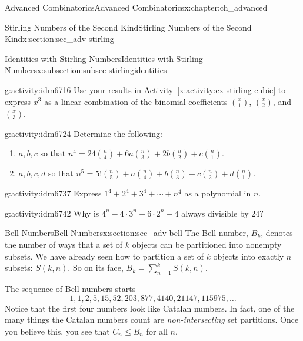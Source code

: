 \documentclass[oneside,10pt,]{book}
\numberwithin{equation}{chapter}
\begin{document}
\begin{chapterptx}{Advanced Combinatorics}{}{Advanced Combinatorics}{}{}{x:chapter:ch_advanced}
\begin{sectionptx}{Stirling Numbers of the Second Kind}{}{Stirling Numbers of the Second Kind}{}{}{x:section:sec_adv-stirling}
\begin{subsectionptx}{Identities with Stirling Numbers}{}{Identities with Stirling Numbers}{}{}{x:subsection:subsec-stirlingidentities}
\begin{activity}{}{g:activity:idm6716}
Use your results in \hyperref[x:activity:ex-stirling-cubic]{Activity~\ref{x:activity:ex-stirling-cubic}} to express \(x^3\) as a linear combination of the binomial coefficients \(\binom{x}{1}\), \(\binom{x}{2}\), and \(\binom{x}{3}\).%
\end{activity}
\begin{activity}{}{g:activity:idm6724}%
Determine the following:%
\begin{enumerate}[font=\bfseries,label=(\alph*),ref=\alph*]
\item{}\(a, b, c\) so that \(n^4 = 24\binom{n}{4} + 6a\binom{n}{3}+2b\binom{n}{2} + c \binom{n}{1}\).%
\item{}\(a, b, c, d\) so that \(n^5 = 5!\binom{n}{5} + a\binom{n}{4} + b\binom{n}{3} + c \binom{n}{2} + d \binom{n}{1}\).%
\end{enumerate}
\end{activity}
\begin{activity}{}{g:activity:idm6737}%
Express \(1^4 + 2^4 + 3^4 + \cdots + n^4\) as a polynomial in \(n\).%
\end{activity}
\begin{activity}{}{g:activity:idm6742}%
Why is \(4^n - 4\cdot 3^n + 6\cdot 2^n - 4\) always divisible by 24?%
\end{activity}
\end{subsectionptx}
\end{sectionptx}
%
%
\typeout{************************************************}
\typeout{************************************************}
%
\begin{sectionptx}{Bell Numbers}{}{Bell Numbers}{}{}{x:section:sec_adv-bell}
The Bell number, \(B_{k}\), denotes the number of ways that a set of \(k\) objects can be partitioned into nonempty subsets. We have already seen how to partition a set of \(k\) objects into exactly \(n\) subsets: \(S(k,n)\).  So on its face, \(B_k = \sum_{n=1}^kS(k,n)\).%
\par
The sequence of Bell numbers starts%
\begin{equation*}
1, 1, 2, 5, 15, 52, 203, 877, 4140, 21147, 115975, \ldots
\end{equation*}
Notice that the first four numbers look like Catalan numbers.  In fact, one of the many things the Catalan numbers count are \emph{non-intersecting} set partitions.  Once you believe this, you see that \(C_n \le B_n\) for all \(n\).%
\par

\end{sectionptx}
\end{chapterptx}
\end{document}
